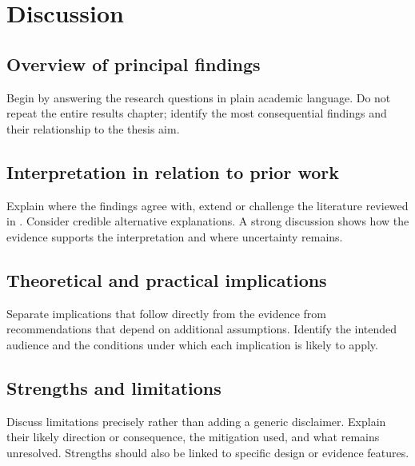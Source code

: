 \chapter{Discussion}
\label{chap:discussion}

\section{Overview of principal findings}
Begin by answering the research questions in plain academic language. Do not repeat
the entire results chapter; identify the most consequential findings and their
relationship to the thesis aim.

\section{Interpretation in relation to prior work}
Explain where the findings agree with, extend or challenge the literature reviewed in
. Consider credible alternative explanations. A strong discussion
shows how the evidence supports the interpretation and where uncertainty remains.

\section{Theoretical and practical implications}
Separate implications that follow directly from the evidence from recommendations that
depend on additional assumptions. Identify the intended audience and the conditions
under which each implication is likely to apply.

\section{Strengths and limitations}
Discuss limitations precisely rather than adding a generic disclaimer. Explain their
likely direction or consequence, the mitigation used, and what remains unresolved.
Strengths should also be linked to specific design or evidence features.

